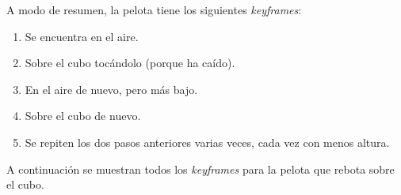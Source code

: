 \documentclass{article}
\begin{document}
\bigskip

A modo de resumen, la pelota tiene los siguientes \textit{keyframes}:

\begin{enumerate}
    \item Se encuentra en el aire.
    \item Sobre el cubo tocándolo (porque ha caído).
    \item En el aire de nuevo, pero más bajo.
    \item Sobre el cubo de nuevo.
    \item Se repiten los dos pasos anteriores varias veces, cada vez con menos altura.
\end{enumerate}

A continuación se muestran todos los \textit{keyframes} para la pelota que rebota sobre el cubo.
\end{document}

